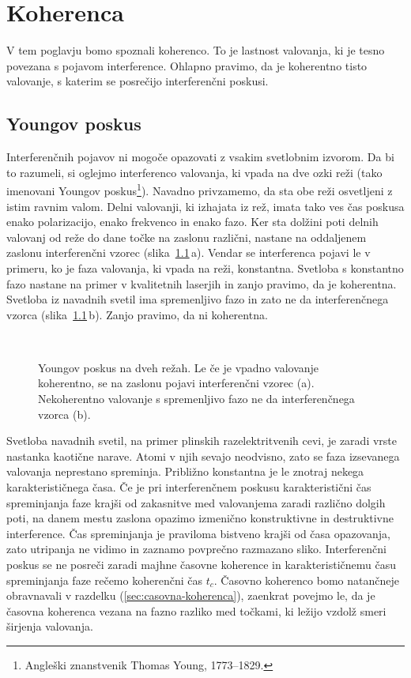 
\chapter{Koherenca}

V tem poglavju bomo spoznali koherenco. To je lastnost
valovanja, ki je tesno povezana s pojavom interference. Ohlapno pravimo,
da je koherentno tisto valovanje, s katerim se posrečijo interferenčni
poskusi.  

\section{Youngov poskus}

Interferenčnih pojavov ni mogoče opazovati z
vsakim svetlobnim izvorom. Da bi to razumeli, si oglejmo interferenco
valovanja, ki vpada na dve ozki reži (tako imenovani Youngov 
poskus\footnote{Angleški znanstvenik Thomas Young, 1773--1829.}). 
Navadno privzamemo, da
sta obe reži osvetljeni z istim ravnim valom. Delni valovanji, ki
izhajata iz rež, imata tako ves čas poskusa enako polarizacijo, enako
frekvenco in enako fazo. Ker sta dolžini poti delnih valovanj od reže do dane 
točke na zaslonu različni, nastane na oddaljenem
zaslonu interferenčni vzorec (slika~\ref{fig:Young}\,a). Vendar se  
interferenca pojavi le v primeru,
ko je faza valovanja, ki vpada na reži, konstantna. Svetloba s konstantno
fazo nastane na primer v kvalitetnih laserjih in zanjo pravimo, da je koherentna.
Svetloba iz navadnih svetil ima spremenljivo fazo in zato ne da
interferenčnega vzorca (slika~\ref{fig:Young}\,b). Zanjo pravimo, da ni koherentna. 
\begin{figure}[ht]
\centering
\def\svgwidth{100truemm} 
\\
\caption{Youngov poskus na dveh režah. Le če je vpadno valovanje koherentno, 
se na zaslonu pojavi interferenčni vzorec (a). Nekoherentno valovanje s spremenljivo
fazo ne da interferenčnega vzorca (b).}
\label{fig:Young}
\end{figure}

Svetloba navadnih svetil, na primer plinskih razelektritvenih cevi, 
je zaradi vrste nastanka kaotične narave. 
Atomi v njih sevajo neodvisno, zato se faza izsevanega valovanja neprestano
spreminja. Približno konstantna je le znotraj nekega karakterističnega
časa. Če je pri interferenčnem poskusu karakteristični čas spreminjanja
faze krajši od zakasnitve med valovanjema zaradi različno
dolgih poti, na danem mestu zaslona opazimo izmenično konstruktivne in 
destruktivne interference. Čas spreminjanja je praviloma
bistveno krajši od časa opazovanja, zato utripanja ne vidimo in 
zaznamo povprečno razmazano sliko. Interferenčni poskus se ne 
posreči zaradi majhne časovne koherence in
karakterističnemu času spreminjanja faze rečemo 
koherenčni čas
$t_{c}$. Časovno koherenco bomo natančneje obravnavali v razdelku
(\ref{sec:casovna-koherenca}), zaenkrat povejmo le, da je časovna
koherenca vezana na fazno razliko med točkami, ki ležijo
vzdolž smeri širjenja valovanja. 

